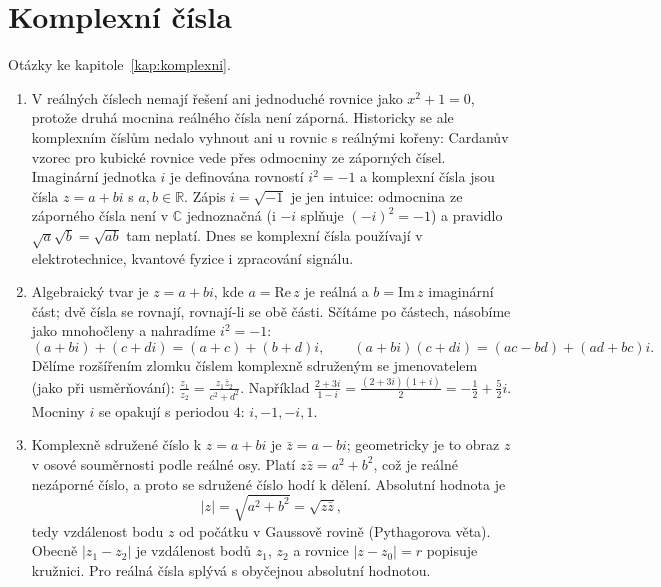 \section{Komplexní čísla}

Otázky ke kapitole~\ref{kap:komplexni}.

\begin{enumerate}[label=\textbf{\arabic*.}, leftmargin=*, itemsep=0.8em]
  \item {}
  V reálných číslech nemají řešení ani jednoduché rovnice jako $x^2 + 1 = 0$, protože druhá mocnina reálného čísla není záporná. Historicky se ale komplexním číslům nedalo vyhnout ani u rovnic s reálnými kořeny: Cardanův vzorec pro kubické rovnice vede přes odmocniny ze záporných čísel. Imaginární jednotka $i$ je definována rovností $i^2 = -1$ a komplexní čísla jsou čísla $z = a + bi$ s $a, b\in\mathbb{R}$. Zápis $i = \sqrt{-1}$ je jen intuice: odmocnina ze záporného čísla není v $\mathbb{C}$ jednoznačná (i $-i$ splňuje ${(-i)}^2 = -1$) a pravidlo $\sqrt{a}\sqrt{b} = \sqrt{ab}$ tam neplatí. Dnes se komplexní čísla používají v elektrotechnice, kvantové fyzice i zpracování signálu. 

  \item {}
  Algebraický tvar je $z = a + bi$, kde $a = \mathrm{Re}\,z$ je reálná a $b = \mathrm{Im}\,z$ imaginární část; dvě čísla se rovnají, rovnají-li se obě části. Sčítáme po částech, násobíme jako mnohočleny a nahradíme $i^2 = -1$:
  \begin{equation*}
    (a + bi) + (c + di) = (a + c) + (b + d)i, \qquad (a + bi)(c + di) = (ac - bd) + (ad + bc)i.
  \end{equation*}
  Dělíme rozšířením zlomku číslem komplexně sdruženým se jmenovatelem (jako při usměrňování): $\frac{z_1}{z_2} = \frac{z_1\bar{z}_2}{c^2 + d^2}$. Například $\frac{2 + 3i}{1 - i} = \frac{(2 + 3i)(1 + i)}{2} = -\frac{1}{2} + \frac{5}{2}i$. Mocniny $i$ se opakují s periodou $4$: $i, -1, -i, 1$. 

  \item {}
  Komplexně sdružené číslo k $z = a + bi$ je $\bar{z} = a - bi$; geometricky je to obraz $z$ v osové souměrnosti podle reálné osy. Platí $z\bar{z} = a^2 + b^2$, což je reálné nezáporné číslo, a proto se sdružené číslo hodí k dělení. Absolutní hodnota je
  \begin{equation*}
    |z| = \sqrt{a^2 + b^2} = \sqrt{z\bar{z}},
  \end{equation*}
  tedy vzdálenost bodu $z$ od počátku v Gaussově rovině (Pythagorova věta). Obecně $|z_1 - z_2|$ je vzdálenost bodů $z_1$, $z_2$ a rovnice $|z - z_0| = r$ popisuje kružnici. Pro reálná čísla splývá s obyčejnou absolutní hodnotou. 


\end{enumerate}
